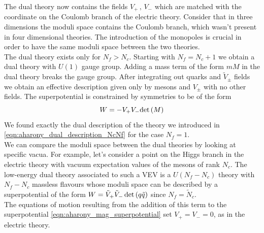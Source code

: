 The dual theory now contains the fields $V_+ \, , \, V_-$ which are matched with the coordinate on the Coulomb branch of the electric theory.
Consider that in three dimensions the moduli space contains the Coulomb branch, which wasn't present in four dimensional theories.
The introduction of the monopoles is crucial in order to have the same moduli space between the two theories.\\
The dual theory exists only for $N_f > N_c$. 
Starting with $N_f =N_c + 1$ we obtain a dual theory with $U(1)$ gauge group. Adding a mass term of the form $m M$ in the dual theory breaks the gauge group. After integrating out quarks and $\tilde{V}_{\pm}$ fields we obtain an effective description given only by mesons and $V_{\pm}$ with no other fields.
The superpotential is constrained by symmetries to be of the form 
\begin{equation}
W = - V_+ V_- \mathrm{det } \,{(M)}
\end{equation}
We found exactly the dual description of the theory we introduced in \eqref{eqn:aharony_dual_description_NcNf} for the case $N_f =1$.
\\
We can compare the moduli space between the dual theories by looking at specific vacua.
For example, let's consider a point on the Higgs branch in the electric theory with vacuum expectation values of the mesons of rank $N_c$.
The low-energy dual theory associated to such a VEV is a $U(N_f - N_c)$ theory with $N_f - N_c$ massless flavours whose moduli space can be described by a superpotential of the form $W = \tilde{V}_+ \tilde{V}_- \, \mathrm{det } \,{( q \tilde{q})} $ since $N_f = \tilde{N}_c$.
\\
The equations of motion resulting from the addition of this term to the superpotential \eqref{eqn:aharony_mag_superpotential} set $V_+ = V_-= 0$, as in the electric theory.\\















